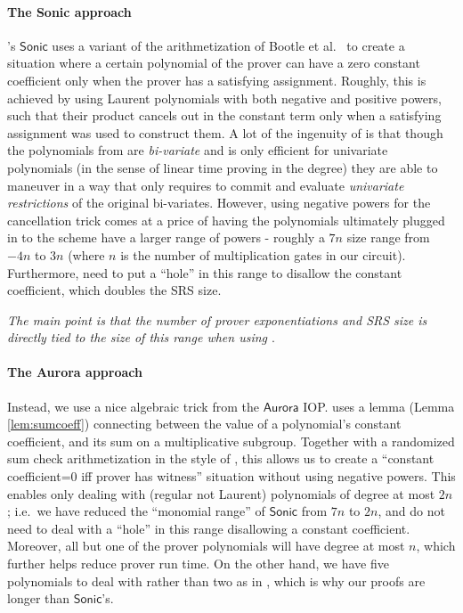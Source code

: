 \documentclass[11pt]{article}
\numberwithin{figure}{section} %
\newcommand{\sonic}{\ensuremath{\mathsf{Sonic}}\xspace}
\newcommand{\aurora}{\ensuremath{\mathsf{Aurora}}\xspace}
\begin{document}
\paragraph{The Sonic approach}
\cite{sonic}'s \sonic uses a variant of the arithmetization of Bootle et al.\ \cite{Bootle} to create a
situation where a certain polynomial of the prover can have a zero constant coefficient only when the prover has a satisfying assignment. Roughly, this is achieved by using Laurent polynomials with both negative and positive powers, such that their product cancels out in the constant term only when a satisfying assignment was used to construct them.
A lot of the ingenuity of \cite{sonic} is that though the polynomials from \cite{Bootle} are \emph{bi-variate}
and \cite{kate} is only efficient for univariate polynomials (in the sense of linear time proving in the degree) they are able to maneuver in a way that only requires to commit and evaluate \emph{univariate restrictions} of the original bi-variates.
However, using negative powers for the cancellation trick comes at a price
of having the polynomials ultimately plugged in to the \cite{kate} scheme  have a larger range of powers - roughly a $7n$ size range from  $-4n$ to $3n$
(where $n$ is the number of multiplication gates in our circuit). Furthermore, \cite{sonic} need to put a ``hole'' in this range to disallow the constant coefficient, which doubles the SRS size.

\emph{The main point is that the number of prover exponentiations and SRS size is directly tied to the size of this range when using \cite{kate}}. 
\paragraph{The Aurora approach}
Instead, we use a nice algebraic trick from the \aurora IOP\cite{aurora}. \cite{aurora} uses a lemma (Lemma \ref{lem:sumcoeff})
connecting between the value of a polynomial's constant coefficient, and its sum on a multiplicative subgroup. Together with a randomized sum check arithmetization in the style of \cite{BCGRS,aurora}, this allows us to create a ``constant coefficient=0 iff prover has witness'' situation without using negative powers.
This enables only dealing with (regular not Laurent) polynomials of degree at most $2n$; i.e.\ we have reduced the ``monomial range'' of \sonic from $7n$ to $2n$, and do not need to deal with a ``hole'' in this range disallowing a constant coefficient. Moreover, all but one of the prover polynomials will have  degree at most $n$, which further helps reduce prover run time. On the other hand, we have five polynomials to deal with rather than two as in \cite{sonic}, which is why our proofs are longer than \sonic's.
\end{document}
